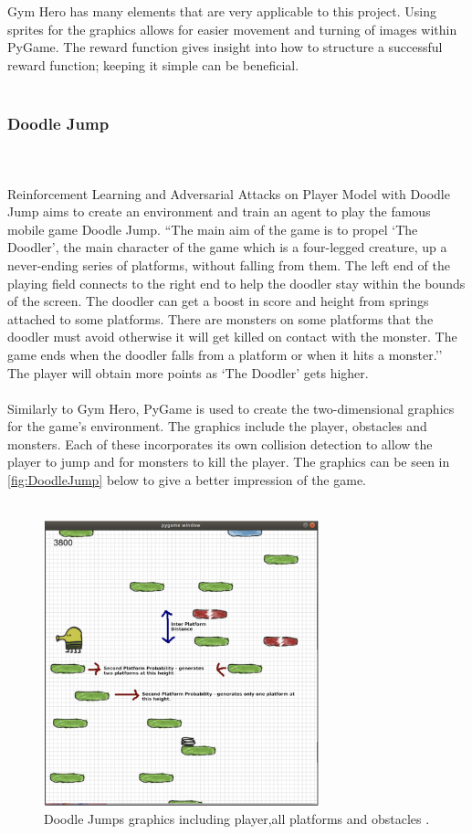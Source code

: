 \documentclass[a4paper,12pt]{article}
\begin{document}
\\\\
Gym Hero has many elements that are very applicable to this project. Using sprites for the graphics allows for easier movement and turning of images within PyGame. The reward function gives insight into how to structure a successful reward function; keeping it simple can be beneficial. 
\\\\
\subsubsection{Doodle Jump}
\\\\
Reinforcement Learning and Adversarial Attacks on Player Model with Doodle Jump aims to create an environment and train an agent to play the famous mobile game Doodle Jump. ``The main aim of the game is to propel `The Doodler’, the main character of the game which is a four-legged creature, up a never-ending series of platforms, without falling from them. The left end of the playing field connects to the right end to help the doodler stay within the bounds of the screen. The doodler can get a boost in score and height from springs attached to some platforms. There are monsters on some platforms that the doodler must avoid otherwise it will get killed on contact with the monster. The game ends when the doodler falls from a platform or when it hits a monster.'' \cite{DoodleJump} The player will obtain more points as `The Doodler' gets higher. 
\\\\
Similarly to Gym Hero, PyGame is used to create the two-dimensional graphics for the game's environment. The graphics include the player, obstacles and monsters. Each of these incorporates its own collision detection to allow the player to jump and for monsters to kill the player. The graphics can be seen in \autoref{fig:DoodleJump} below to give a better impression of the game. 
\\\\
\begin{figure}[H]
\centering
\includegraphics[width=8cm]{imgs/DoodleJump.png}
\caption{Doodle Jumps graphics including player,all platforms and obstacles \cite{DoodleJump}.}
\label{fig:DoodleJump}
\end{figure}\\\\
\end{document}
